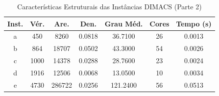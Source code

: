 \begin{table}[H]
\centering
\caption{Características Estruturais das Instâncias DIMACS (Parte 2)}
\label{tab:info_instancias}
\begin{tabular}{ccccccc}
\toprule
\textbf{Inst.} & \textbf{Vér.} & \textbf{Are.} & \textbf{Den.} & \textbf{Grau Méd.} & \textbf{Cores} & \textbf{Tempo (s)} \\
\midrule
a & 450 & 8260 & 0.0818 & 36.7100 & 26 & 0.0013 \\
b & 864 & 18707 & 0.0502 & 43.3000 & 54 & 0.0026 \\
c & 1000 & 14378 & 0.0288 & 28.7600 & 23 & 0.0024 \\
d & 1916 & 12506 & 0.0068 & 13.0500 & 10 & 0.0034 \\
e & 4730 & 286722 & 0.0256 & 121.2400 & 56 & 0.0513 \\
\bottomrule
\end{tabular}
\end{table}
